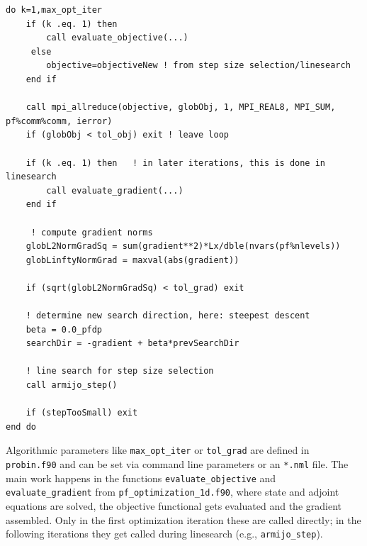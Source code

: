 \documentclass[a4paper]{article} %
\begin{document}
\begin{lstlisting}[frame=tb,caption={Most important parts of the optimization loop from \lstinline|main.f90|},label=lst:optloop]
do k=1,max_opt_iter
	if (k .eq. 1) then
		call evaluate_objective(...)
	 else
		objective=objectiveNew ! from step size selection/linesearch
	end if
	
	call mpi_allreduce(objective, globObj, 1, MPI_REAL8, MPI_SUM, pf%comm%comm, ierror)
	if (globObj < tol_obj) exit ! leave loop

	if (k .eq. 1) then   ! in later iterations, this is done in linesearch
		call evaluate_gradient(...)
	end if
	
	 ! compute gradient norms
	globL2NormGradSq = sum(gradient**2)*Lx/dble(nvars(pf%nlevels))
	globLinftyNormGrad = maxval(abs(gradient))
	
	if (sqrt(globL2NormGradSq) < tol_grad) exit
	
	! determine new search direction, here: steepest descent
	beta = 0.0_pfdp
	searchDir = -gradient + beta*prevSearchDir
	
	! line search for step size selection
	call armijo_step()
	
	if (stepTooSmall) exit
end do
\end{lstlisting}
%
Algorithmic parameters like \lstinline|max_opt_iter| or \lstinline|tol_grad| are defined in \lstinline|probin.f90| and can be set via command line parameters or an \lstinline|*.nml| file. The main work happens in the functions \lstinline|evaluate_objective| and \lstinline|evaluate_gradient| from \lstinline|pf_optimization_1d.f90|, where state and adjoint equations are solved, the objective functional gets evaluated and the gradient assembled. Only in the first optimization iteration these are called directly; in the following iterations they get called during linesearch (e.g., \lstinline|armijo_step|).
\end{document}
